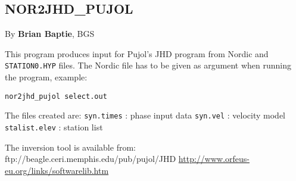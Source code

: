 
\subsection{NOR2JHD\_PUJOL} 

By \textbf{Brian Baptie}, BGS 

This program produces input for Pujol's JHD program \citep{pujol2003} from Nordic and \texttt{STATION0.HYP} files. The Nordic file has to be given as argument when running the program, example: 

\texttt{nor2jhd\_pujol select.out}

The files created are: 
\texttt{syn.times} : phase input data\newline
\texttt{syn.vel} : velocity model\newline
\texttt{stalist.elev} : station list 

The inversion tool is available from:\newline
\indent ftp://beagle.ceri.memphis.edu/pub/pujol/JHD \newline
\indent \url{http://www.orfeus-eu.org/links/softwarelib.htm} 

